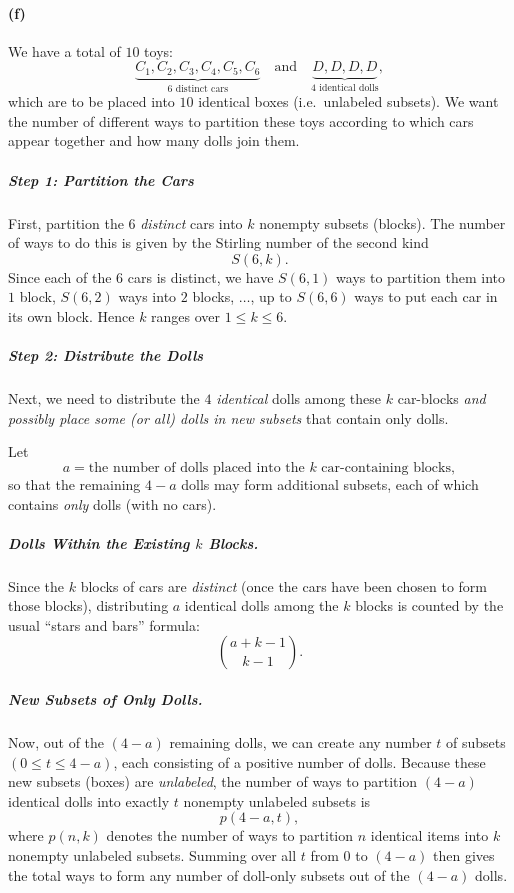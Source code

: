 \documentclass[docmute]{article}
\begin{document}
\paragraph{(f)}

We have a total of \(10\) toys:
\[
\underbrace{C_1, C_2, C_3, C_4, C_5, C_6}_{\text{6 distinct cars}}
\quad\text{and}\quad
\underbrace{D, D, D, D}_{\text{4 identical dolls}},
\]
which are to be placed into \(10\) identical boxes (i.e.\ unlabeled subsets). 
We want the number of different ways to partition these toys according to which cars appear together and how many dolls join them.

\subparagraph*{Step 1: Partition the Cars}

First, partition the \(6\) \emph{distinct} cars into \(k\) nonempty subsets (blocks).  
The number of ways to do this is given by the Stirling number of the second kind 
\[
S(6,k).
\]
Since each of the \(6\) cars is distinct, we have 
\(S(6,1)\) ways to partition them into \(1\) block, 
\(S(6,2)\) ways into \(2\) blocks, \(\dots\), up to 
\(S(6,6)\) ways to put each car in its own block.  
Hence \(k\) ranges over \(1 \le k \le 6\).

\subparagraph*{Step 2: Distribute the Dolls}

Next, we need to distribute the \(4\) \emph{identical} dolls among these \(k\) car-blocks 
\emph{and possibly place some (or all) dolls in new subsets} that contain only dolls.

Let
\[
a = \text{the number of dolls placed into the }k\text{ car-containing blocks},
\]
so that the remaining \(4-a\) dolls may form additional subsets, each of which contains \emph{only} dolls (with no cars).

\subparagraph{Dolls Within the Existing \(k\) Blocks.}

Since the \(k\) blocks of cars are \emph{distinct} (once the cars have been chosen to form those blocks), distributing \(a\) identical dolls among the \(k\) blocks is counted by the usual ``stars and bars'' formula:
\[
\binom{a + k - 1}{k - 1}.
\]

\subparagraph{New Subsets of Only Dolls.}

Now, out of the \((4 - a)\) remaining dolls, we can create any number \(t\) of subsets \((0 \le t \le 4-a)\), each consisting of a positive number of dolls.  
Because these new subsets (boxes) are \emph{unlabeled}, the number of ways to partition \((4 - a)\) identical dolls into exactly \(t\) nonempty unlabeled subsets is
\[
p(4 - a, t),
\]
where \(p(n, k)\) denotes the number of ways to partition \(n\) identical items into \(k\) nonempty unlabeled subsets.  
Summing over all \(t\) from \(0\) to \((4-a)\) then gives the total ways to form any number of doll-only subsets out of the \((4 - a)\) dolls.
\end{document}
